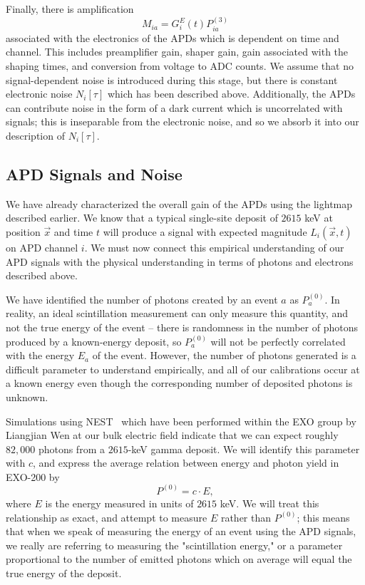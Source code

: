 Finally, there is amplification
\begin{equation} \label{eqn:DefnOfMFromP3}
M_{ia} = G^{E}_i(t) P^{(3)}_{ia}
\end{equation}
associated with the electronics of the APDs which is dependent on time and channel.  This includes preamplifier gain, shaper gain, gain associated with the shaping times, and conversion from voltage to ADC counts.  We assume that no signal-dependent noise is introduced during this stage, but there is constant electronic noise $N_i[\tau]$ which has been described above.  Additionally, the APDs can contribute noise in the form of a dark current which is uncorrelated with signals; this is inseparable from the electronic noise, and so we absorb it into our description of $N_i[\tau]$.

\subsection{APD Signals and Noise}

We have already characterized the overall gain of the APDs using the lightmap described earlier.  We know that a typical single-site deposit of $2615$ keV at position $\vec{x}$ and time $t$ will produce a signal with expected magnitude $L_i(\vec{x},t)$ on APD channel $i$.  We must now connect this empirical understanding of our APD signals with the physical understanding in terms of photons and electrons described above.

We have identified the number of photons created by an event $a$ as $P^{(0)}_a$.  In reality, an ideal scintillation measurement can only measure this quantity, and not the true energy of the event -- there is randomness in the number of photons produced by a known-energy deposit, so $P^{(0)}_a$ will not be perfectly correlated with the energy $E_a$ of the event.  However, the number of photons generated is a difficult parameter to understand empirically, and all of our calibrations occur at a known energy even though the corresponding number of deposited photons is unknown.

Simulations using NEST~\cite{NESTpaper} which have been performed within the EXO group by Liangjian Wen at our bulk electric field indicate that we can expect roughly $82,000$ photons from a $2615$-keV gamma deposit.  We will identify this parameter with $c$, and express the average relation between energy and photon yield in EXO-200 by
\begin{equation} \label{eqn:DefnOfP0}
P^{(0)} = c \cdot E,
\end{equation}
where $E$ is the energy measured in units of $2615$ keV.  We will treat this relationship as exact, and attempt to measure $E$ rather than $P^{(0)}$; this means that when we speak of measuring the energy of an event using the APD signals, we really are referring to measuring the "scintillation energy," or a parameter proportional to the number of emitted photons which on average will equal the true energy of the deposit.

